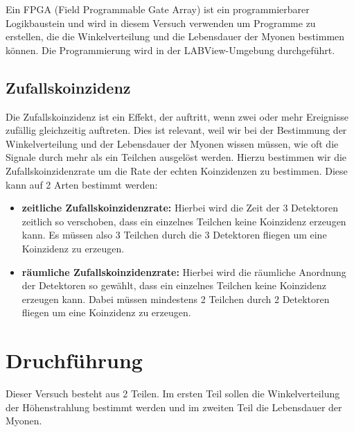 \documentclass{article}
\begin{document}
Ein FPGA (Field Programmable Gate Array) ist ein programmierbarer Logikbaustein und wird in diesem Versuch verwenden um Programme zu erstellen, die die Winkelverteilung
und die Lebensdauer der Myonen bestimmen können.
Die Programmierung wird in der LABView-Umgebung durchgeführt.
\subsection{Zufallskoinzidenz} 
Die Zufallskoinzidenz ist ein Effekt, der auftritt, wenn zwei oder mehr Ereignisse zufällig gleichzeitig auftreten. 
Dies ist relevant, weil wir bei der Bestimmung der Winkelverteilung und der Lebensdauer der Myonen wissen müssen, wie oft die Signale durch mehr als ein Teilchen
ausgelöst werden. Hierzu bestimmen wir die Zufallskoinzidenzrate um die Rate der echten Koinzidenzen zu bestimmen.
Diese kann auf 2 Arten bestimmt werden:
\begin{itemize}
    \item \textbf{zeitliche Zufallskoinzidenzrate:} Hierbei wird die Zeit der 3 Detektoren zeitlich so verschoben, dass ein einzelnes Teilchen keine Koinzidenz erzeugen kann.
        Es müssen also 3 Teilchen durch die 3 Detektoren fliegen um eine Koinzidenz zu erzeugen.
    \item \textbf{räumliche Zufallskoinzidenzrate:} Hierbei wird die räumliche Anordnung der Detektoren so gewählt, dass ein einzelnes Teilchen keine Koinzidenz erzeugen kann.
        Dabei müssen mindestens 2 Teilchen durch 2 Detektoren fliegen um eine Koinzidenz zu erzeugen.
\end{itemize}   

\section{Druchführung}
Dieser Versuch besteht aus 2 Teilen. Im ersten Teil sollen die Winkelverteilung der Höhenstrahlung bestimmt werden und im zweiten Teil die Lebensdauer der Myonen.
\end{document}
